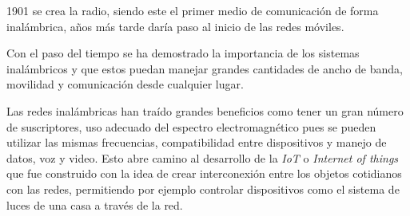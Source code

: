\documentclass[10pt,journal,compsoc]{IEEEtran}
\begin{document}




% 
% 
% 
% 
 1901 se crea la radio, siendo este el primer medio de comunicación de forma inalámbrica, años más tarde daría paso al inicio de las redes móviles. 

Con el paso del tiempo se ha demostrado la importancia de los sistemas inalámbricos y que estos puedan manejar grandes cantidades de ancho de banda, movilidad y comunicación desde cualquier lugar. 

Las redes inalámbricas han traído grandes beneficios como tener un gran número de suscriptores, uso adecuado del espectro electromagnético pues se pueden utilizar las mismas frecuencias, compatibilidad entre dispositivos y manejo de datos, voz y video. Esto abre camino al desarrollo de la \emph{IoT} o \emph{Internet of things} que fue construido con la idea de crear interconexión entre los objetos cotidianos con las redes, permitiendo por ejemplo controlar dispositivos como el sistema de luces de una casa a través de la red. 
\end{document}
